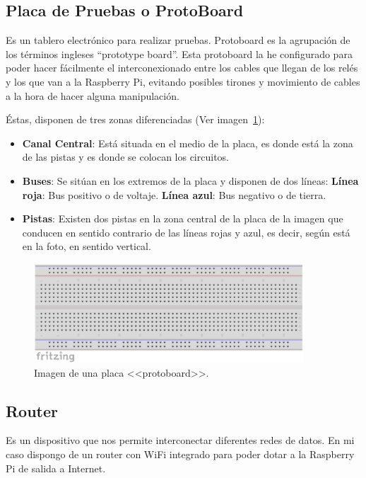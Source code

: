\subsection{Placa de Pruebas o ProtoBoard}\label{4:protoboard}
Es un tablero electrónico para realizar pruebas. Protoboard es la agrupación de los términos ingleses “prototype board”.
Esta protoboard la he configurado para poder hacer fácilmente el interconexionado entre los cables que llegan de los relés y los que van a la Raspberry Pi, evitando posibles tirones y movimiento de cables a la hora de hacer alguna manipulación.

Éstas, disponen de tres zonas diferenciadas (Ver imagen~\ref{Img:Protoboard}):

\begin{itemize}
    \item \textbf{Canal Central}: Está situada en el medio de la placa, es donde está la zona de las pistas y es donde se colocan los circuitos.
    \item \textbf{Buses}: Se sitúan en los extremos de la placa y disponen de dos líneas:
        \subitem \textbf{Línea roja}: Bus positivo o de voltaje.
        \subitem \textbf{Línea azul}: Bus negativo o de tierra.
    \item \textbf{Pistas}: Existen dos pistas en la zona central de la placa de la imagen que conducen en sentido contrario de las líneas rojas y azul, es decir, según está en la foto, en sentido vertical.
\end{itemize}

\begin{figure}
    \centering
    \includegraphics[width=0.9\textwidth]{img/protoboard.pdf}
    \caption{Imagen de una placa <<protoboard>>. } \label{Img:Protoboard}
\end{figure}

\subsection{Router}\label{4:Router}
Es un dispositivo que nos permite interconectar diferentes redes de datos. En mi caso dispongo de un router con WiFi integrado para poder dotar a la Raspberry Pi de salida a Internet.

